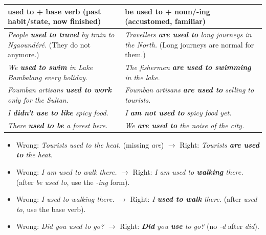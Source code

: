 \documentclass[11pt]{article}
\begin{document}
\begin{center}
\begin{tabularx}{\linewidth}{|X|X|}\hline
\rowcolor{popblueL} \textbf{used to + base verb (past habit/state, now finished)} & \textbf{be used to + noun/-ing (accustomed, familiar)} \\ \hline
\emph{People \textbf{used to travel} by train to Ngaoundéré.} (They do not anymore.) & \emph{Travellers \textbf{are used to} long journeys in the North.} (Long journeys are normal for them.) \\ \hline
\emph{We \textbf{used to swim} in Lake Bambalang every holiday.} & \emph{The fishermen \textbf{are used to swimming} in the lake.} \\ \hline
\emph{Foumban artisans \textbf{used to work} only for the Sultan.} & \emph{Foumban artisans \textbf{are used to} selling to tourists.} \\ \hline
\emph{I \textbf{didn't use to like} spicy food.} & \emph{I \textbf{am not used to} spicy food yet.} \\ \hline
\emph{There \textbf{used to be} a forest here.} & \emph{We \textbf{are used to} the noise of the city.} \\ \hline
\end{tabularx}
\end{center}

\begin{attention}
\begin{itemize}
\item Wrong: \emph{Tourists used to the heat.} (missing \emph{are}) $\rightarrow$ Right: \emph{Tourists \textbf{are used to} the heat.}
\item Wrong: \emph{I am used to walk there.} $\rightarrow$ Right: \emph{I am used to \textbf{walking} there.} (after \emph{be used to}, use the \emph{-ing} form).
\item Wrong: \emph{I used to walking there.} $\rightarrow$ Right: \emph{I \textbf{used to walk} there.} (after \emph{used to}, use the base verb).
\item Wrong: \emph{Did you used to go?} $\rightarrow$ Right: \emph{\textbf{Did} you \textbf{use} to go?} (no \emph{-d} after \emph{did}).
\end{itemize}
\end{attention}
\end{document}
